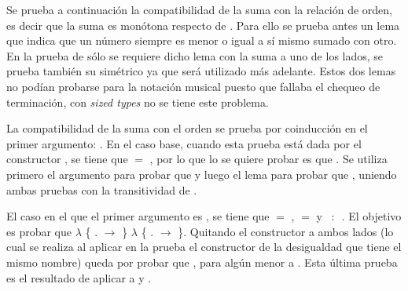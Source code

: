 Se prueba a continuación la compatibilidad de la suma con la relación de orden, es decir que la suma es monótona respecto de \AgdaFunction{$\leq$}. Para ello se prueba antes un lema que indica que un número siempre es menor o igual a sí mismo sumado con otro. En la prueba de  sólo se requiere dicho lema con la suma a uno de los lados, se prueba también su simétrico ya que será utilizado más adelante. Estos dos lemas no podían probarse para la notación musical puesto que fallaba el chequeo de terminación, con \textit{sized types} no se tiene este problema.

La compatibilidad de la suma con el orden se prueba por coinducción en el primer argumento:  \AgdaFunction{$\leq$} . En el caso base, cuando esta prueba está dada por el constructor , se tiene que  $=$ , por lo que lo se quiere probar es que  \AgdaFunction{$\leq$}  \AgdaFunction{+} . Se utiliza primero el argumento  para probar que  \AgdaFunction{$\leq$}  y luego el lema  para probar que  \AgdaFunction{$\leq$}  \AgdaFunction{+} , uniendo ambas pruebas con la transitividad de \AgdaFunction{$\leq$}. 

El caso en el que el primer argumento es  , se tiene que  $=$  ,  $=$   y \hbox{ $:$ \AgdaFunction{[}  \AgdaFunction{]}     }. El objetivo es probar que \AgdaFunction{[}  \AgdaFunction{]}  $\lambda$ \{ $.$ $\rightarrow$   \AgdaFunction{+}  \} \AgdaFunction{$\leq$}  $\lambda$ \{ $.$ $\rightarrow$   \AgdaFunction{+}  \}. Quitando el constructor  a ambos lados (lo cual se realiza al aplicar en la prueba el constructor de la desigualdad que tiene el mismo nombre) queda por probar que \AgdaFunction{[}  \AgdaFunction{]}   \AgdaFunction{+}  \AgdaFunction{$\leq$}   \AgdaFunction{+} , para algún  menor a . Esta última prueba es el resultado de aplicar  a   y .

